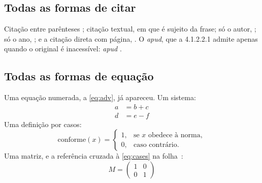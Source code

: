 \documentclass[dsc,pdfa,coorientador,numbers,twoside,orientadorexamina]{coppe}
\begin{document}
  \subsection{Todas as formas de citar}
  Citação entre parênteses \citep{book-example}; citação textual, em que
  \citet{article-example} é sujeito da frase; só o autor,
  \citeauthor{book-example}; só o ano, \citeyear{book-example}; e a
  citação direta com página, \citep[p.~37]{m-4234}. O \emph{apud}, que a
  4.1.2.2.1 admite apenas quando o original é inacessível:
  \citeauthor{m-4211} \emph{apud} \citet{book-example}.

  \subsection{Todas as formas de equação}
  Uma equação numerada, a \autoref{eq:adv}, já apareceu. Um sistema:
  \begin{align}
    a &= b + c \label{eq:align1}\\
    d &= e - f \label{eq:align2}
  \end{align}
  Uma definição por casos:
  \begin{equation}\label{eq:cases}
    \mathrm{conforme}(x) = \begin{cases}
      1, & \text{se } x \text{ obedece à norma},\\
      0, & \text{caso contrário.}
    \end{cases}
  \end{equation}
  Uma matriz, e a referência cruzada à \eqref{eq:cases} na
  folha~\pageref{eq:cases}:
  \begin{equation}\label{eq:matriz}
    M = \begin{pmatrix} 1 & 0\\ 0 & 1 \end{pmatrix}
  \end{equation}
\end{document}
